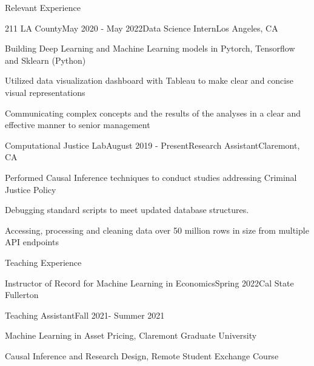 \documentclass{resume} %
\begin{document}
\begin{rSection}{Relevant Experience}
\begin{rSubsection}{211 LA County}{May 2020 - May 2022}{Data Science Intern}{Los Angeles, CA}
\item Building Deep Learning and Machine Learning models in Pytorch,
Tensorflow and Sklearn (Python)
\item Utilized data visualization dashboard with Tableau to make clear and concise visual representations
\item Communicating complex concepts and the results of the analyses in a clear and effective manner to senior management
\end{rSubsection}
\begin{rSubsection}{Computational Justice Lab}{August 2019 - Present}{Research Assistant}{Claremont, CA}
\item Performed Causal Inference techniques to conduct studies addressing Criminal Justice Policy
\item Debugging standard scripts to meet updated database
structures.
\item Accessing, processing and cleaning data over 50 million rows in size from multiple API endpoints
\end{rSubsection}
\end{rSection}

\begin{rSection}{Teaching Experience}
\begin{rSubsection}{Instructor of Record for Machine Learning in Economics}{Spring 2022}{Cal State Fullerton}{}



\vspace{-.1cm}
\vspace{-0.7cm}
\item[]
\end{rSubsection}

\begin{rSubsection}{Teaching Assistant}{Fall 2021- Summer 2021}{}{}

\item Machine Learning in Asset Pricing, Claremont Graduate University
\item Causal Inference and Research Design, Remote Student Exchange Course

\vspace{-0.7cm}
\item[]
\end{rSubsection}
\end{rSection}
\end{document}
